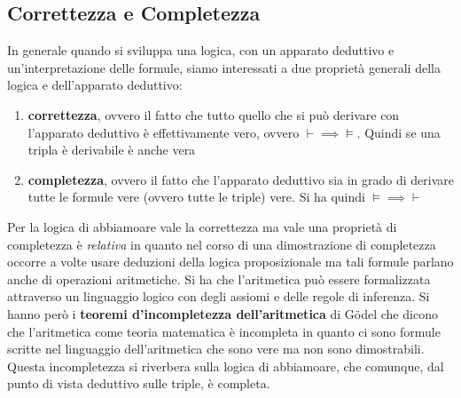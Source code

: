 				     \subsection{Correttezza e Completezza}
				      				In generale quando si sviluppa una logica, con un apparato deduttivo e
				      				un'interpretazione delle formule, siamo interessati a due proprietà generali
				      				della logica e dell'apparato deduttivo:
				      				\begin{enumerate}
				      					\item \textbf{correttezza}, ovvero il fatto che tutto quello che si può
				      					      derivare con l'apparato deduttivo è effettivamente vero, ovvero
				      					      $\vdash\implies\vDash$. Quindi se una tripla è derivabile è anche vera
				      					\item \textbf{completezza}, ovvero il fatto che l'apparato deduttivo sia in
				      					      grado di derivare tutte le formule vere (ovvero tutte le triple) vere. Si ha
				      					      quindi $\vDash\implies\vdash$
				      				\end{enumerate}
				      				Per la logica di abbiamoare vale la correttezza ma vale una proprietà di completezza
				      				è \textit{relativa} in quanto nel corso di una dimostrazione di completezza
				      				occorre a volte usare deduzioni della logica proposizionale ma tali formule
				      				parlano anche di operazioni aritmetiche. Si ha che l'aritmetica può essere
				      				formalizzata attraverso un linguaggio logico con degli assiomi e delle regole di
				      				inferenza. Si hanno però i \textbf{teoremi d'incompletezza dell'aritmetica} di
				      				G\"{o}del che dicono che l'aritmetica come teoria matematica è incompleta in
				      				quanto ci sono formule scritte nel linguaggio dell'aritmetica che sono vere ma
				      				non sono dimostrabili. Questa incompletezza si riverbera sulla logica di abbiamoare,
				      				che comunque, dal punto di vista deduttivo sulle triple, è completa.
